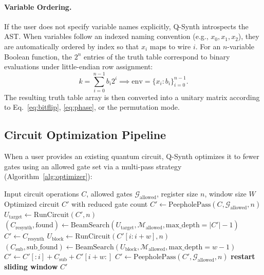 \documentclass[11pt]{article}
\begin{document}
\paragraph{Variable Ordering.}
If the user does not specify variable names explicitly, Q-Synth introspects the AST. When variables follow an indexed naming convention (e.g., $x_0, x_1, x_2$), they are automatically ordered by index so that $x_i$ maps to wire $i$. For an $n$-variable Boolean function, the $2^n$ entries of the truth table correspond to binary evaluations under little-endian row assignment:
\begin{equation}
    k = \sum_{i=0}^{n-1} b_i 2^i \implies \mathrm{env} = \{ x_i: b_i \}_{i=0}^{n-1}.
\end{equation}
The resulting truth table array is then converted into a unitary matrix according to Eq.~\eqref{eq:bitflip}, \eqref{eq:phase}, or the permutation mode.

\subsection{Circuit Optimization Pipeline}
When a user provides an existing quantum circuit, Q-Synth optimizes it to fewer gates using an allowed gate set via a multi-pass strategy (Algorithm~\ref{alg:optimizer}):

\begin{algorithm}[htbp]
\caption{Q-Synth Multi-Pass Circuit Optimizer}
\label{alg:optimizer}
\begin{algorithmic}[1]
\Require Input circuit operations $C$, allowed gates $\mathcal{G}_{\text{allowed}}$, register size $n$, window size $W$
\Ensure Optimized circuit $C'$ with reduced gate count
\State $C' \gets \mathrm{PeepholePass}(C, \mathcal{G}_{\text{allowed}}, n)$ 
\State $U_{\text{target}} \gets \mathrm{RunCircuit}(C', n)$
\State {}
\State $(C_{\text{resynth}}, \mathrm{found}) \gets \mathrm{BeamSearch}(U_{\text{target}}, \mathcal{M}_{\text{allowed}}, \mathrm{max\_depth}=|C'|-1)$
    \State $C' \gets C_{\text{resynth}}$
\EndIf
\State {}
        \State $U_{\text{block}} \gets \mathrm{RunCircuit}(C'[i : i+w], n)$
        \State $(C_{\text{sub}}, \mathrm{sub\_found}) \gets \mathrm{BeamSearch}(U_{\text{block}}, \mathcal{M}_{\text{allowed}}, \mathrm{max\_depth}=w-1)$
            \State $C' \gets C'[:i] + C_{\text{sub}} + C'[i+w:]$
            \State $C' \gets \mathrm{PeepholePass}(C', \mathcal{G}_{\text{allowed}}, n)$
            \State \textbf{restart sliding window}
        \EndIf
    \EndFor
\EndFor
\State \Return $C'$
\end{algorithmic}
\end{algorithm}
\end{document}
